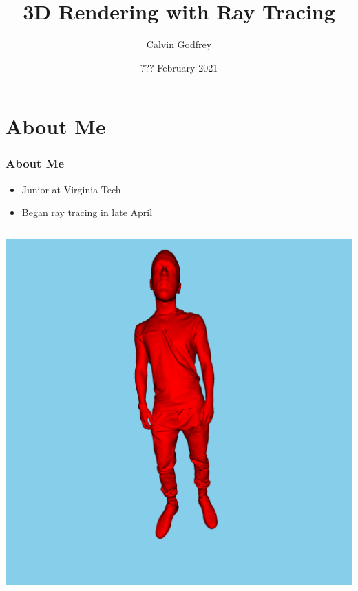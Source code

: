 \documentclass{beamer}
\title[Ray Tracing] %
{3D Rendering with Ray Tracing}
\author{Calvin Godfrey}
\institute[] %
{Virginia Polytechnic Institute and State University}
\date[https://github.com/calvin-godfrey/RenderingWorkshop]{??? February 2021}
\begin{document}
\begin{frame}
	\titlepage
\end{frame}

\section{About Me}

\begin{frame}
	\frametitle{About Me}
	\begin{itemize}
		\item Junior at Virginia Tech
		\item Began ray tracing in late April
	\end{itemize}
	\begin{columns}[T]
		\begin{column}{0.5\textwidth}
			\centering
			\includegraphics[width=\textwidth]{media/person.jpg}


\end{column}
\end{columns}
\end{frame}
\end{document}
